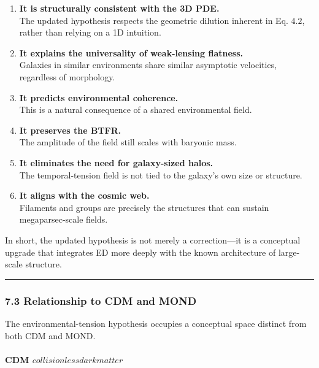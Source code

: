 \begin{enumerate}
\def\labelenumi{\arabic{enumi}.}
\item
  \textbf{It is structurally consistent with the 3D PDE.}\\
  The updated hypothesis respects the geometric dilution inherent in Eq.
  \(4.2\), rather than relying on a 1D intuition.
\item
  \textbf{It explains the universality of weak-lensing flatness.}\\
  Galaxies in similar environments share similar asymptotic velocities,
  regardless of morphology.
\item
  \textbf{It predicts environmental coherence.}\\
  This is a natural consequence of a shared environmental field.
\item
  \textbf{It preserves the BTFR.}\\
  The amplitude of the field still scales with baryonic mass.
\item
  \textbf{It eliminates the need for galaxy-sized halos.}\\
  The temporal-tension field is not tied to the galaxy's own size or
  structure.
\item
  \textbf{It aligns with the cosmic web.}\\
  Filaments and groups are precisely the structures that can sustain
  megaparsec-scale fields.
\end{enumerate}

In short, the updated hypothesis is not merely a correction---it is a
conceptual upgrade that integrates ED more deeply with the known
architecture of large-scale structure.

\begin{center}\rule{0.5\linewidth}{0.5pt}\end{center}

\subsubsection{7.3 Relationship to CDM and
MOND}\label{relationship-to-cdm-and-mond}

The environmental-tension hypothesis occupies a conceptual space
distinct from both CDM and MOND.

\paragraph{\texorpdfstring{\textbf{CDM
\(collisionless dark matter\)}}{CDM collisionless dark matter}}\label{cdm-collisionless-dark-matter}

